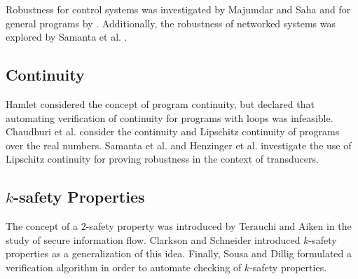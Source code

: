\documentclass{llncs}
\begin{document}
Robustness for control systems was investigated by Majumdar and Saha \cite{majumdar09} and for general programs by \cite{chaudhuri11}.  Additionally, the robustness of networked systems was explored by Samanta et al. \cite{samanta13a}.

\subsection{Continuity}

Hamlet \cite{hamlet02} considered the concept of program continuity, but declared that automating verification of continuity for programs with loops was infeasible.  Chaudhuri et al. \cite{chaudhuri10,chaudhuri11} consider the continuity and Lipschitz continuity of programs over the real numbers. Samanta et al. \cite{samanta13} and Henzinger et al. \cite{samanta14} investigate the use of Lipschitz continuity for proving robustness in the context of transducers.

\subsection{\(k\)-safety Properties}

The concept of a 2-safety property was introduced by Terauchi and Aiken \cite{terauchi05} in the study of secure information flow.  Clarkson and Schneider \cite{clarkson08} introduced \(k\)-safety properties as a generalization of this idea.  Finally, Sousa and Dillig \cite{sousa16} formulated a verification algorithm in order to automate checking of \(k\)-safety properties.

%
%


\end{document}
